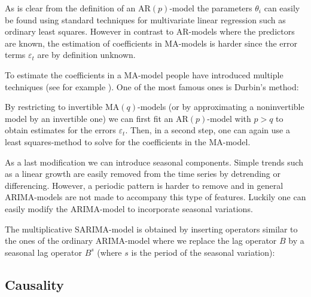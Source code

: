 
    \begin{remark}
        As is clear from the definition of an $\text{AR}(p)$-model the parameters $\theta_i$ can easily be found using standard techniques for multivariate linear regression such as ordinary least squares. However in contrast to AR-models where the predictors are known, the estimation of coefficients in MA-models is harder since the error terms $\varepsilon_t$ are by definition unknown.
    \end{remark}
    To estimate the coefficients in a MA-model people have introduced multiple techniques (see for example \cite{MA_fit}). One of the most famous ones is Durbin's method:
    \begin{method}[Durbin]
        By restricting to invertible $\text{MA}(q)$-models (or by approximating a noninvertible model by an invertible one) we can first fit an $\text{AR}(p)$-model with $p>q$ to obtain estimates for the errors $\varepsilon_t$. Then, in a second step, one can again use a least squares-method to solve for the coefficients in the MA-model.
    \end{method}

    As a last modification we can introduce seasonal components. Simple trends such as a linear growth are easily removed from the time series by detrending or differencing. However, a periodic pattern is harder to remove and in general ARIMA-models are not made to accompany this type of features. Luckily one can easily modify the ARIMA-model to incorporate seasonal variations.

    The multiplicative SARIMA-model is obtained by inserting operators similar to the ones of the ordinary ARIMA-model where we replace the lag operator $B$ by a seasonal lag operator $B^s$ (where $s$ is the period of the seasonal variation):

\subsection{Causality}

